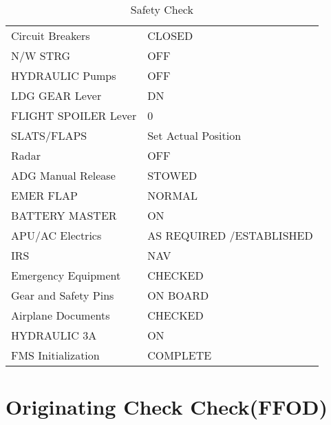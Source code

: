 \begin{table}[htbp]
\begin{minipage}{\linewidth}
\setlength{\tymax}{0.5\linewidth}
\centering
\small
\caption{Safety Check}
\label{safetycheck}
\begin{tabulary}{\textwidth}{@{}ll@{}} \toprule
\midrule

 Circuit Breakers  & CLOSED     \\
 N\slash W STRG    & OFF      \\
 HYDRAULIC Pumps  & OFF      \\
 LDG GEAR Lever  & DN      \\
 FLIGHT SPOILER Lever & 0       \\
 SLATS\slash FLAPS   & Set Actual Position  \\
 Radar    & OFF      \\
 ADG Manual Release & STOWED     \\
 EMER FLAP   & NORMAL     \\
 BATTERY MASTER  & ON      \\
 APU\slash AC Electrics  & AS REQUIRED \slash  ESTABLISHED \\
 IRS     & NAV      \\
 Emergency Equipment & CHECKED     \\
 Gear and Safety Pins & ON BOARD     \\
 Airplane Documents & CHECKED     \\
 HYDRAULIC 3A   & ON      \\
 FMS Initialization & COMPLETE     \\
\bottomrule

\end{tabulary}
\end{minipage}
\end{table}

\chapter{Originating Check Check(FFOD)}
\label{originatingcheckcheckffod}


